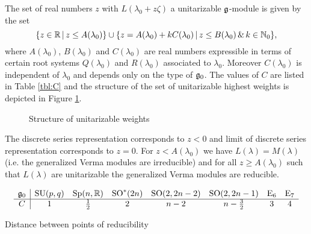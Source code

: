 \documentclass[12pt,a4paper,final]{report}
\begin{document}
\begin{theorem}
 The set of real numbers $z$ with $L(\lambda_0 + z\zeta)$ a unitarizable $\mathfrak{g}$-module is given by the set
\[
  \{z \in \mathbb{R}\, |\, z \leq A(\lambda_0)\} \cup \{ z=A(\lambda_0) + k C(\lambda_0)\,|\, z \leq B(\lambda_0) \,\&\, k\in \mathbb{N}_0\},
\]
where $A(\lambda_0)$, $B(\lambda_0)$ and $C(\lambda_0)$ are real numbers expressible in terms of certain root systems $Q(\lambda_0)$ and $R(\lambda_0)$ associated to $\lambda_0$. Moreover $C(\lambda_0)$ is independent of $\lambda_0$ and depends only on the type of $\mathfrak{g}_0$. The values of $C$ are listed in Table \ref{tbl:C} and the structure of the set of unitarizable highest weights is depicted in Figure \ref{fig:struct}.

\begin{figure}[H]
  \begin{center}
  \end{center}\caption{Structure of unitarizable weights}\label{fig:struct} %
\end{figure}
	
The discrete series representation corresponds to $z <0$ and limit of discrete series representation corresponds to $z=0$. For $z  < A(\lambda_0)$ we have $L(\lambda) = M(\lambda)$ (i.e. the generalized Verma modules are irreducible) and for all $z \geq A(\lambda_0)$ such that $L(\lambda)$ are unitarizable the generalized Verma modules are reducible.%

\begin{table}[h]
\[\begin{array}{c|ccccccc}
\mathfrak{g}_0 & \mathrm{SU}(p,q) & \mathrm{Sp}(n,\mathbb{R}) & \mathrm{SO}^*(2n) & \mathrm{SO}(2,2n-2) & \mathrm{SO}(2,2n-1) & \mathrm{E}_6 & \mathrm{E}_7\\\hline
C & 1 & \frac{1}{2} & 2 & n-2 & n-\frac{3}{2} & 3 & 4
\end{array}\]\caption{Distance between points of reducibility}\label{tbl:C}
\end{table}
\end{theorem}
\end{document}
